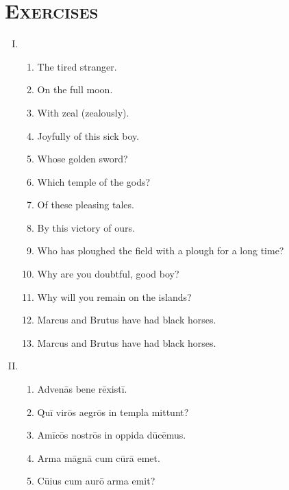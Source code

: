 \documentclass[12pt]{article}
\begin{document}
\section{\textsc{Exercises}}
\begin{enumerate}[I.]
	\setlength{\itemsep}{1em}
	\item \begin{enumerate}[1)]
		\item The tired stranger.
		\item On the full moon.
		\item With zeal (zealously).
		\item Joyfully of this sick boy.
		\item Whose golden sword?
		\item Which temple of the gods?
		\item Of these pleasing tales.
		\item By this victory of ours.
		\item Who has ploughed the field with a plough for a long time?
		\item Why are you doubtful, good boy?
		\item Why will you remain on the islands?
		\item Marcus and Brutus have had black horses.
		\item Marcus and Brutus have had black horses.
	\end{enumerate}
	\item \begin{enumerate}[1)]
		\item Advenās bene rēxistī.
		\item Quī virōs aegrōs in templa mittunt?
		\item Amīcōs nostrōs in oppida dūcēmus.
		\item Arma māgnā cum cūrā emet.
		\item Cūius cum aurō arma emit?
	\end{enumerate}
\end{enumerate}

\clearpage
\end{document}
